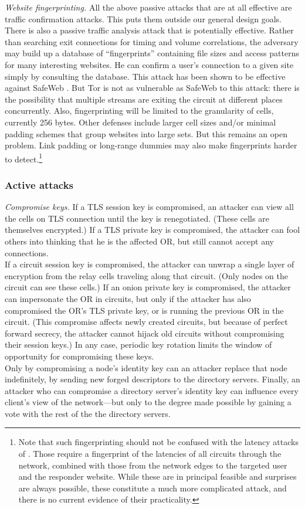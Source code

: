 \documentclass[times,10pt,twocolumn]{article}
\begin{document}
\emph{Website fingerprinting.} All the above passive
attacks that are at all effective are traffic confirmation attacks.
This puts them outside our general design goals. There is also
a passive traffic analysis attack that is potentially effective.
Rather than searching exit connections for timing and volume
correlations, the adversary may build up a database of
``fingerprints'' containing file sizes and access patterns for many
interesting websites. He can confirm a user's connection to a given
site simply by consulting the database. This attack has
been shown to be effective against SafeWeb \cite{hintz-pet02}. But
Tor is not as vulnerable as SafeWeb to this attack: there is the
possibility that multiple streams are exiting the circuit at
different places concurrently.  Also, fingerprinting will be limited to
the granularity of cells, currently 256 bytes. Other defenses include
larger cell sizes and/or minimal padding schemes that group websites
into large sets. But this remains an open problem.  Link
padding or long-range dummies may also make fingerprints harder to
detect.\footnote{Note that
such fingerprinting should not be confused with the latency attacks
of \cite{back01}. Those require a fingerprint of the latencies of
all circuits through the network, combined with those from the
network edges to the targeted user and the responder website. While
these are in principal feasible and surprises are always possible,
these constitute a much more complicated attack, and there is no
current evidence of their practicality.}

\subsubsection*{Active attacks}

\emph{Compromise keys.}
If a TLS session key is compromised, an attacker
can view all the cells on TLS connection until the key is
renegotiated.  (These cells are themselves encrypted.)  If a TLS
private key is compromised, the attacker can fool others into
thinking that he is the affected OR, but still cannot accept any
connections. \\
If a circuit session key is compromised, the
attacker can unwrap a single layer of encryption from the relay
cells traveling along that circuit.  (Only nodes on the circuit can
see these cells.) If an onion private key is compromised, the attacker
can impersonate the OR in circuits, but only if the attacker has
also compromised the OR's TLS private key, or is running the
previous OR in the circuit.  (This compromise affects newly created
circuits, but because of perfect forward secrecy, the attacker
cannot hijack old circuits without compromising their session keys.)
In any case, periodic key rotation limits the window of opportunity
for compromising these keys. \\
Only by
compromising a node's identity key can an attacker replace that
node indefinitely, by sending new forged descriptors to the
directory servers.  Finally, an attacker who can compromise a
directory server's identity key can influence every client's view
of the network---but only to the degree made possible by gaining a
vote with the rest of the the directory servers.
\end{document}
